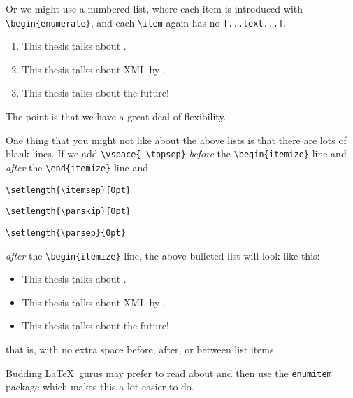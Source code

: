 \noindent Or we might use a numbered list, where each item is
introduced with \verb|\begin{enumerate}|, and each \verb|\item| again
has no \verb|[...text...]|.
\begin{enumerate}
    \item This thesis talks about \sysacro.
    \item This thesis talks about XML \citep{1188581} by \citealt{1188581}.
    \item This thesis talks about the future!
\end{enumerate}

\noindent The point is that we have a great deal of flexibility.

One thing that you might not like about the above lists is that there
are lots of blank lines.  If we add
\verb|\vspace{-\topsep}|
\emph{before} the \verb|\begin{itemize}| line and
\emph{after} the \verb|\end{itemize}| line and
\vspace{-\topsep}
\begin{description}
    \setlength{\itemsep}{0pt}
    \setlength{\parskip}{0pt}
    \setlength{\parsep}{0pt}
    \item[\quad] \verb|\setlength{\itemsep}{0pt}|
    \item[\quad] \verb|\setlength{\parskip}{0pt}|
    \item[\quad] \verb|\setlength{\parsep}{0pt}|
\end{description}
\vspace{-\topsep}
\emph{after} the \verb|\begin{itemize}| line, the above bulleted list
will look like this:
\vspace{-\topsep}
\begin{itemize}
    \setlength{\parskip}{0pt}
    \setlength{\itemsep}{0pt}
    \setlength{\parskip}{0pt}
    \setlength{\parsep}{0pt}
    \item This thesis talks about \sysacro.
    \item This thesis talks about XML \citep{1188581} by \citealt{1188581}.
    \item This thesis talks about the future!
\end{itemize}
\vspace{-\topsep}
that is, with no extra space before, after, or between list items.

Budding \LaTeX\ gurus may prefer to read about and then use the
\verb|enumitem| package which makes this a lot easier to do.
